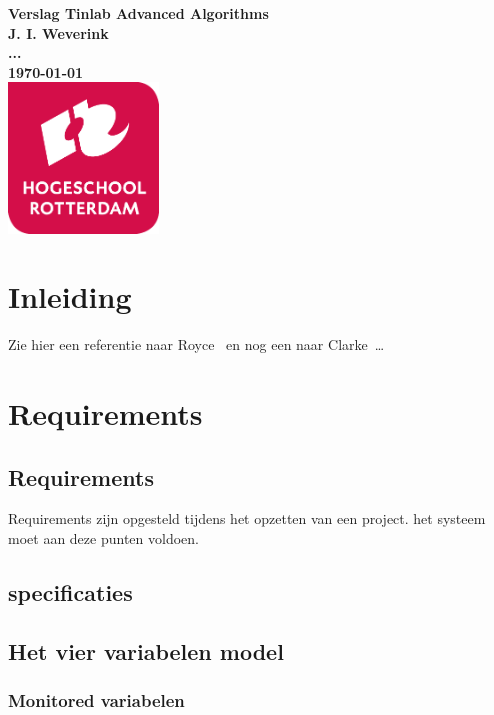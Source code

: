 \documentclass{article}
\begin{document}
\sffamily
\begin{titlepage}
  \centering
    \vfill
    {\bfseries\Huge
      Verslag Tinlab Advanced Algorithms \\
        \vskip2cm
      }
      {\bfseries\Large
        J. I. Weverink\\
      }
      {
        \bfseries\normalsize
        ...\\
        \vskip1cm
        \today\\
    }    
    \vfill
    \includegraphics[width=4cm]{logohr.png} %
    \vfill
    \vfill
\end{titlepage}
\newpage
\tableofcontents

\newpage
\section{Inleiding}
Zie hier een referentie naar Royce~\cite{royce1987managing} en nog een naar Clarke~\cite{modelchecking}\ldots 

\section{Requirements}

\subsection{Requirements}
Requirements zijn opgesteld tijdens het opzetten van een project. het systeem moet aan deze punten voldoen.

\subsection{specificaties}

\subsection{Het vier variabelen model}
\subsubsection{Monitored variabelen}
\end{document}
